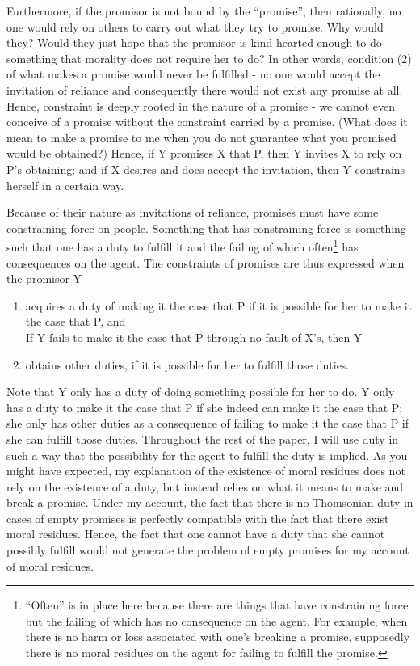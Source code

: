 Furthermore, if the promisor is not bound by the ``promise'', then
rationally, no one would rely on others to carry out what they try to
promise. Why would they? Would they just hope that the promisor is
kind-hearted enough to do something that morality does not require her
to do? In other words, condition (2) of what makes a promise would never
be fulfilled - no one would accept the invitation of reliance and
consequently there would not exist any promise at all. Hence, constraint
is deeply rooted in the nature of a promise - we cannot even conceive of
a promise without the constraint carried by a promise. (What does it
mean to make a promise to me when you do not guarantee what you promised
would be obtained?) Hence, if Y promises X that P, then Y invites X to
rely on P's obtaining; and if X desires and does accept the invitation,
then Y constrains herself in a certain way.

Because of their nature as invitations of reliance, promises must have
some constraining force on people. Something that has constraining force
is something such that one has a duty to fulfill it and the failing of
which often\footnote{``Often'' is in place here because there are things
  that have constraining force but the failing of which has no
  consequence on the agent. For example, when there is no harm or loss
  associated with one's breaking a promise, supposedly there is no moral
  residues on the agent for failing to fulfill the promise.} has
consequences on the agent. The constraints of promises are thus
expressed when the promisor Y

\begin{displayquote} \def\labelenumi{(\arabic{enumi})}
	\itshape 
	\begin{enumerate}
		\item acquires a duty of making it the case that P if it is possible
for her to make it the case that P, and \\

			If Y fails to make it the case that P through no fault of X's,
then Y
		\item obtains other duties, if it is possible for her to fulfill
those duties. 
	\end{enumerate}
\end{displayquote}

\noindent Note that Y only has a duty of doing something possible for her to do. Y
only has a duty to make it the case that P if she indeed can make it the
case that P; she only has other duties as a consequence of failing to
make it the case that P if she can fulfill those duties. Throughout the
rest of the paper, I will use duty in such a way that the possibility
for the agent to fulfill the duty is implied. As you might have
expected, my explanation of the existence of moral residues does not
rely on the existence of a duty, but instead relies on what it means to
make and break a promise. Under my account, the fact that there is no
Thomsonian duty in cases of empty promises is perfectly compatible with
the fact that there exist moral residues. Hence, the fact that one
cannot have a duty that she cannot possibly fulfill would not generate
the problem of empty promises for my account of moral residues.

